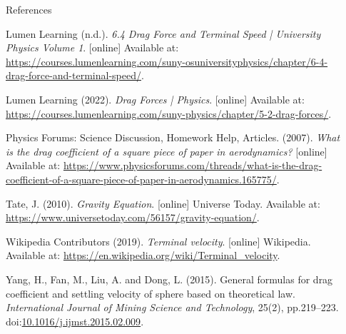 \documentclass[final]{beamer}
\newlength{\sepwidth}
\newlength{\colwidth}
\newcommand{\separatorcolumn}{\begin{column}{\sepwidth}\end{column}}
\begin{document}
\begin{frame}[t]
\begin{columns}[t]
\begin{column}{\colwidth}
\begin{block}{References}
\begin{thebibliography}{9}
Lumen Learning (n.d.). \emph{6.4 Drag Force and Terminal Speed | University Physics Volume 1}. [online] Available at: \url{https://courses.lumenlearning.com/suny-osuniversityphysics/chapter/6-4-drag-force-and-terminal-speed/}.

Lumen Learning (2022). \emph{Drag Forces | Physics}. [online] Available at: \url{https://courses.lumenlearning.com/suny-physics/chapter/5-2-drag-forces/}.

Physics Forums: Science Discussion, Homework Help, Articles. (2007). \emph{What is the drag coefficient of a square piece of paper in aerodynamics?} [online] Available at: \url{https://www.physicsforums.com/threads/what-is-the-drag-coefficient-of-a-square-piece-of-paper-in-aerodynamics.165775/}.

Tate, J. (2010). \emph{Gravity Equation}. [online] Universe Today. Available at: \url{https://www.universetoday.com/56157/gravity-equation/}.

Wikipedia Contributors (2019). \emph{Terminal velocity}. [online] Wikipedia. Available at: \url{https://en.wikipedia.org/wiki/Terminal_velocity}.

Yang, H., Fan, M., Liu, A. and Dong, L. (2015). General formulas for drag coefficient and settling velocity of sphere based on theoretical law. \emph{International Journal of Mining Science and Technology}, 25(2), pp.219–223. doi:\href{https://doi.org/10.1016/j.ijmst.2015.02.009}{10.1016/j.ijmst.2015.02.009}.
\end{thebibliography}
\endgroup
  \end{block}

\end{column}

\separatorcolumn
\end{columns}
\end{frame}
\end{document}
